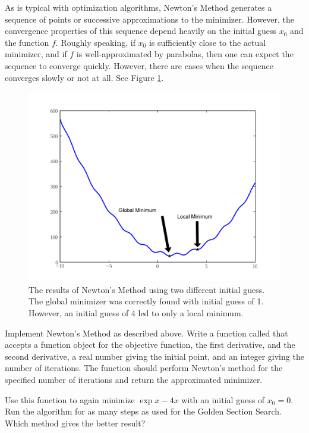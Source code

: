 As is typical with optimization algorithms, Newton's Method generates a sequence of
points or successive approximations to the minimizer. However, the convergence
properties of this sequence depend heavily on the initial guess $x_0$ and the function
$f$. Roughly speaking, if $x_0$ is sufficiently close to the actual minimizer, and if
$f$ is well-approximated by parabolas, then one can expect the sequence to converge
quickly. However, there are cases when the sequence converges slowly or not at all.
See Figure \ref{linesearch:newton}.

\begin{figure}
\centering
\includegraphics[width=\textwidth]{newton.pdf}
\caption{The results of Newton's Method using two
different initial guess. The global minimizer was
correctly found with initial guess of 1. However,
an initial guess of 4 led to only a local minimum.}
\label{linesearch:newton}
\end{figure}

\begin{problem}
Implement Newton's Method as described above. Write a function called  that
accepts a function object for the objective function, the first derivative, and the
second derivative, a real number giving the initial point, and an integer giving the number
of iterations. The function should perform Newton's method for the specified number of iterations
and return the approximated minimizer.

Use this function to again minimize $\exp{x} - 4x$
with an initial guess of $x_0 = 0$. Run the algorithm for as many steps as used for the
Golden Section Search. Which method gives the better result?
\end{problem}

